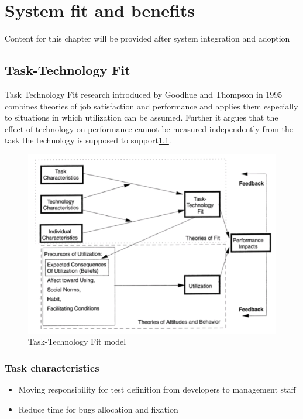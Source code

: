 \chapter{System fit and benefits}
\label{chap:fitsBenefits}
Content for this chapter will be provided after system integration and adoption
\section{Task-Technology Fit}
Task Technology Fit research introduced by Goodhue and Thompson in 1995 \cite{MES10} combines theories of job satisfaction and performance and applies them especially to situations in which utilization can be assumed. Further it argues that the effect of technology on performance cannot be measured independently from the task the technology is supposed to support\ref{fig:ttf}.
\begin{figure}[ht]
	\label{fig:ttf}
	\centering
	\includegraphics[width=\textwidth]{grafiken/ttf.png}
	\caption{Task-Technology Fit model\cite{MES10}}
\end{figure}

\subsection{Task characteristics}
\begin{itemize}
	\item Moving responsibility for test definition from developers to management staff
	\item Reduce time for bugs allocation and fixation
\end{itemize}


